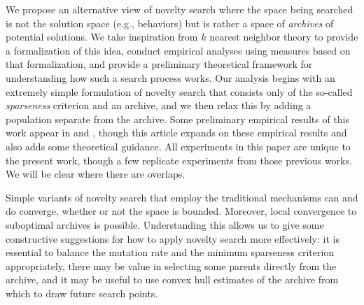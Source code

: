 \documentclass[twoside]{article}
\begin{document}
We propose an alternative view of novelty search where the space being searched is not the solution space (e.g., behaviors) but is rather a space of \emph{archives} of potential solutions.  We take inspiration from $k$ nearest neighbor theory to provide a formalization of this idea, conduct empirical analyses using measures based on that formalization, and provide a preliminary theoretical framework for understanding how such a search process works.  Our analysis begins with an extremely simple formulation of novelty search that consists only of the so-called \emph{sparseness} criterion and an archive, and we then relax this by adding a population separate from the archive.  Some preliminary empirical results of this work appear in \citet{Wiegand2020flairs} and \citet{Wiegand2021flairs}, though this article expands on these empirical results and also adds some theoretical guidance.  All experiments in this paper are unique to the present work, though a few replicate experiments from those previous works.  We will be clear where there are overlaps.

  Simple variants of novelty search that employ the traditional mechanisms can and do converge, whether or not the space is bounded.  Moreover, local convergence to suboptimal archives is possible.  Understanding this allows us to give some constructive suggestions for how to apply novelty search more effectively: it is essential to balance the mutation rate and the minimum sparseness criterion appropriately, there may be value in selecting some parents directly from the archive, and it may be useful to use convex hull estimates of the archive from which to draw future search points.
\end{document}
